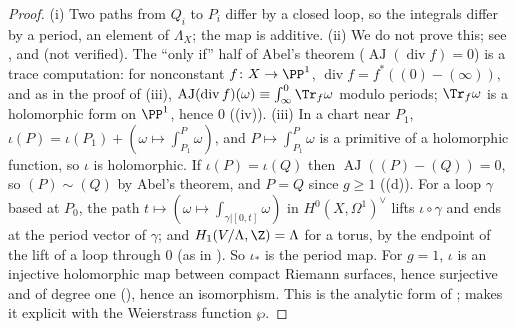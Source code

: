 \begin{proof}
(i) Two paths from $Q_i$ to $P_i$ differ by a closed loop, so the integrals differ by a period, an element of $\Lambda_X$; the map is additive.
(ii) We do not prove this; see \cite[Chapter VIII]{Miranda}, \cite[Sections 20 and 21]{Forster81} and \cite[Chapter 2, Section 2]{GriffithsHarris78} (not verified).
The ``only if'' half of Abel's theorem ($\operatorname{AJ}(\operatorname{div}f)=0$) is a trace computation: for nonconstant $f\colon X\to\PP^1$,
$\operatorname{div}f=f^*((0)-(\infty))$, and as in the proof of (iii), $\operatorname{AJ}(\operatorname{div}f)(\omega)\equiv\int_\infty^0\Tr_f\omega$
modulo periods; $\Tr_f\omega$ is a holomorphic form on $\PP^1$, hence $0$ ((iv)).
(iii) In a chart near $P_1$, $\iota(P)=\iota(P_1)+(\omega\mapsto\int_{P_1}^P\omega)$, and $P\mapsto\int_{P_1}^P\omega$ is a primitive of a holomorphic function, so $\iota$ is holomorphic. If
$\iota(P)=\iota(Q)$ then $\operatorname{AJ}((P)-(Q))=0$, so $(P)\sim(Q)$ by Abel's theorem, and $P=Q$ since $g\ge1$ ((d)). For a loop $\gamma$ based at
$P_0$, the path $t\mapsto(\omega\mapsto\int_{\gamma|[0,t]}\omega)$ in $H^0(X,\Omega^1)^\vee$ lifts $\iota\circ\gamma$ and ends at the period vector of $\gamma$; and $H_1(V/\Lambda,\Z)=\Lambda$ for a
torus, by the endpoint of the lift of a loop through $0$ (as in ). So $\iota_*$ is the period map. For $g=1$, $\iota$ is an injective holomorphic map
between compact Riemann surfaces, hence surjective and of degree one (), hence an isomorphism. This is the analytic form of
;  makes it explicit with the Weierstrass function $\wp$.
\end{proof}

